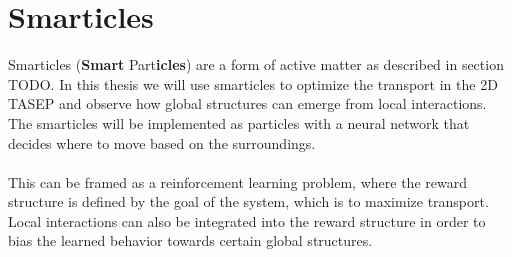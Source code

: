 \section{Smarticles}
\label{sec:smarticles}
Smarticles (\textbf{Smart} Part\textbf{icles}) are a form of active matter as described in section TODO. In this thesis we will use smarticles to optimize the transport in the 2D TASEP and observe how global structures can emerge from local interactions. The smarticles will be implemented as particles with a neural network that decides where to move based on the surroundings. 
\\
\\
This can be framed as a reinforcement learning problem, where the reward structure is defined by the goal of the system, which is to maximize transport. Local interactions can also be integrated into the reward structure in order to bias the learned behavior towards certain global structures.  









